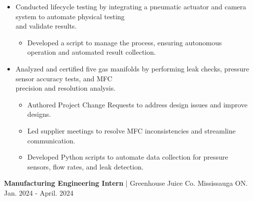 \documentclass{article}
\begin{document}
\vspace{-0.2cm}
\begin{itemize}[leftmargin=1.5cm]

    \item {Conducted lifecycle testing by integrating a pneumatic actuator and camera system to automate physical testing \\ and validate results.
    \vspace{-0.2cm}
    \begin{itemize} [label=$\circ$, leftmargin=0.5cm]
        \item {Developed a script to manage the process, ensuring autonomous operation and automated result collection.}
    \end{itemize}
    }


    \vspace{-0.2cm}
    \item Analyzed and certified five gas manifolds by performing leak checks, pressure sensor accuracy tests, and MFC \\ precision and resolution analysis.
    \vspace{-0.2cm}
    \begin{itemize} [label=$\circ$, leftmargin=0.5cm]
        \item Authored Project Change Requests to address design issues and improve designs.
        \item Led supplier meetings to resolve MFC inconsistencies and streamline communication.
        \item Developed Python scripts to automate data collection for pressure sensors, flow rates, and leak detection.

    \end{itemize}
        
    

    
\end{itemize}


\textbf{\hspace{-0.10cm} Manufacturing Engineering Intern} | Greenhouse Juice Co. Mississauga ON. \hspace{2.2cm} {\small Jan. 2024 - April. 2024}
\end{document}
